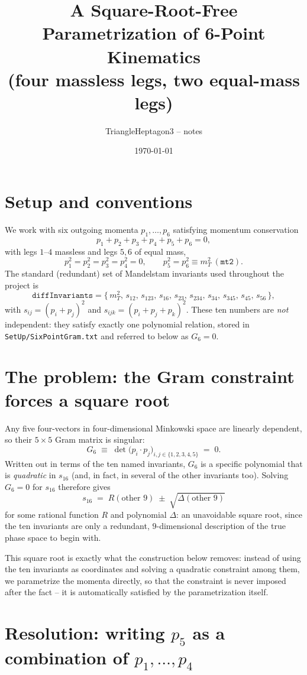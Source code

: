\documentclass[11pt]{article}
\title{A Square-Root-Free Parametrization of 6-Point Kinematics\\
\large (four massless legs, two equal-mass legs)}
\author{TriangleHeptagon3 -- \code{4DBasis} notes}
\date{\today}
\newcommand{\pp}[2]{p_{#1}\!\cdot\! p_{#2}}
\newcommand{\code}[1]{\texttt{#1}}
\begin{document}
\maketitle

\section{Setup and conventions}

We work with six outgoing momenta $p_1,\dots,p_6$ satisfying momentum conservation
\[
  p_1+p_2+p_3+p_4+p_5+p_6=0 ,
\]
with legs $1$--$4$ massless and legs $5,6$ of equal mass,
\[
  p_1^2=p_2^2=p_3^2=p_4^2=0, \qquad p_5^2=p_6^2\equiv m_T^2 \ (\code{mt2}).
\]
The standard (redundant) set of Mandelstam invariants used throughout the project is
\[
  \texttt{diffInvariants} = \{\,m_T^2,\,s_{12},\,s_{123},\,s_{16},\,s_{23},\,s_{234},\,s_{34},\,s_{345},\,s_{45},\,s_{56}\,\},
\]
with $s_{ij}=(p_i+p_j)^2$ and $s_{ijk}=(p_i+p_j+p_k)^2$. These ten numbers are \emph{not} independent: they satisfy exactly one polynomial relation, stored in \code{SetUp/SixPointGram.txt} and referred to below as $G_6=0$.

\section{The problem: the Gram constraint forces a square root}

Any five four-vectors in four-dimensional Minkowski space are linearly dependent, so their $5\times5$ Gram matrix is singular:
\[
  G_6 \;\equiv\; \det\big(\pp{i}{j}\big)_{i,j\in\{1,2,3,4,5\}} \;=\; 0 .
\]
Written out in terms of the ten named invariants, $G_6$ is a specific polynomial that is \emph{quadratic} in $s_{16}$ (and, in fact, in several of the other invariants too). Solving $G_6=0$ for $s_{16}$ therefore gives
\[
  s_{16} \;=\; R(\text{other 9}) \;\pm\; \sqrt{\Delta(\text{other 9})}
\]
for some rational function $R$ and polynomial $\Delta$: an unavoidable square root, since the ten invariants are only a redundant, $9$-dimensional description of the true phase space to begin with.

This square root is exactly what the construction below removes: instead of using the ten invariants as coordinates and solving a quadratic constraint among them, we parametrize the momenta directly, so that the constraint is never imposed after the fact -- it is automatically satisfied by the parametrization itself.

\section{Resolution: writing $p_5$ as a combination of $p_1,\dots,p_4$}
\end{document}
